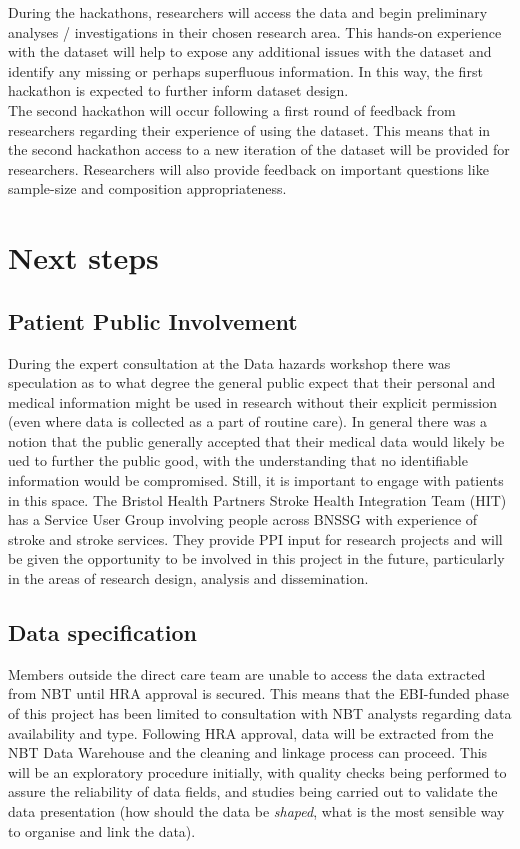 \documentclass{article}
\begin{document}
During the hackathons, researchers will access the data and begin
preliminary analyses / investigations in their chosen research
area. This hands-on experience with the dataset will help to expose
any additional issues with the dataset and identify any missing or
perhaps superfluous information. In this way, the first hackathon is
expected to further inform dataset design. \\

The second hackathon will occur following a first round of feedback
from researchers regarding their experience of using the dataset. This
means that in the second hackathon access to a new iteration of the
dataset will be provided for researchers. Researchers will also
provide feedback on important questions like sample-size and
composition appropriateness. 

\section{Next steps}


\subsection{Patient Public Involvement}


During the expert consultation at the Data hazards workshop there was speculation as to what degree the general public expect that
their personal and medical information might be used in research
without their explicit permission (even where data is collected as a
part of routine care).
In general there was a notion that the public generally accepted that
their medical data would likely be ued to further the public good,
with the understanding that no identifiable information would be
compromised. Still, it is important to engage with patients in this
space. The Bristol Health Partners Stroke Health Integration Team
(HIT) has a Service User Group involving people across BNSSG with
experience of stroke and stroke services.
They provide PPI input for research projects and will be given the
opportunity to be involved in this project in the future,
particularly in the areas of research design, analysis and
dissemination.

\subsection{Data specification}

Members outside the direct care team are unable to access the data
extracted from NBT until HRA approval is secured. This means that the
EBI-funded phase of this project has been limited to consultation with
NBT analysts regarding data availability and type. Following HRA
approval, data will be extracted from the NBT Data Warehouse and the
cleaning and linkage process can proceed. This will be an exploratory
procedure initially, with quality checks being performed to assure the
reliability of data fields, and studies being carried out to validate
the data presentation (how should the data be \textit{shaped}, what is
the most sensible way to organise and link the data).\\
\end{document}
